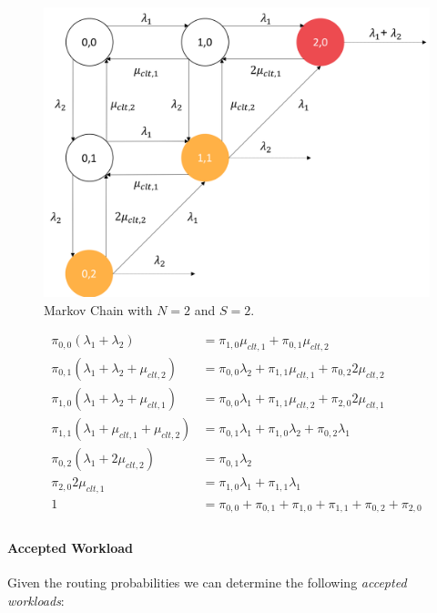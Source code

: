 \begin{figure}
	\includegraphics[width=\columnwidth]{fig/analytical-model-markov}
	\caption{Markov Chain with $N=2$ and $S=2$.}
	\label{fig:analytical-model-markov}
\end{figure}

\begin{equation} 
\begin{split}
\pi_{0,0}(\lambda_{1}+\lambda_{2})& = \pi_{1,0}\mu_{clt,1}+\pi_{0,1}\mu_{clt,2} \\
\pi_{0,1}(\lambda_{1}+\lambda_{2}+\mu_{clt,2}) & = \pi_{0,0}\lambda_{2}+\pi_{1,1}\mu_{clt,1}+\pi_{0,2}2\mu_{clt,2} \\
\pi_{1,0}(\lambda_{1}+\lambda_{2}+\mu_{clt,1}) & = \pi_{0,0}\lambda_{1}+\pi_{1,1}\mu_{clt,2}+\pi_{2,0}2\mu_{clt,1} \\
\pi_{1,1}(\lambda_{1}+\mu_{clt,1}+\mu_{clt,2}) & = \pi_{0,1}\lambda_{1}+\pi_{1,0}\lambda_{2}+\pi_{0,2}\lambda_{1} \\
\pi_{0,2}(\lambda_{1}+2\mu_{clt,2}) & = \pi_{0,1}\lambda_{2} \\
\pi_{2,0}2\mu_{clt,1} & = \pi_{1,0}\lambda_{1}+\pi_{1,1}\lambda_{1} \\
1 & = \pi_{0,0}+\pi_{0,1}+\pi_{1,0}+\pi_{1,1}+\pi_{0,2}+\pi_{2,0}\\
\end{split}
\label{eqn:analytical-model-markov}
\end{equation}

\paragraph{Accepted Workload}
Given the routing probabilities we can determine the following \textit{accepted workloads}:


